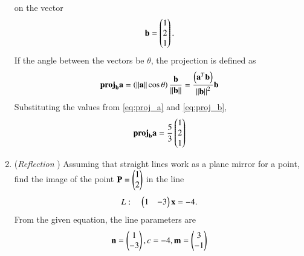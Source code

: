 \begin{enumerate}[label=\thesection.\arabic*.,ref=\thesection.\theenumi]
\begin{align}
\end{align}
on the vector
\begin{align}
\label{eq:proj_b}
\mathbf{b}=\begin{pmatrix}1\\2\\1\end{pmatrix}.
\end{align}
\solution 
%
If the angle between the vectors be $\theta$, the projection is defined as 
\begin{align}
\textbf{proj}_{\mathbf{b}}\mathbf{a} = 
\left(\left\lVert\mathbf{a}\right\rVert\cos\theta\right) \frac{\mathbf{b}}{\left\lVert\mathbf{b}\right\rVert}
=  \frac{\left(\mathbf{a}^T\mathbf{b}\right)}{\left\lVert\mathbf{b}\right\rVert^2}\mathbf{b}
\end{align}
Substituting the values from \eqref{eq:proj_a}
 and \eqref{eq:proj_b},
\begin{align}
\textbf{proj}_{\mathbf{b}}\mathbf{a} = \frac{5}{3}\begin{pmatrix}1\\2\\1\end{pmatrix}
\end{align}
\item ({\em Reflection }) Assuming that straight lines work as a plane mirror for a point, find the image of the point $\mathbf{P}=\begin{pmatrix}1\\2\end{pmatrix}$ in the line 
%
\begin{align}
L: \quad \begin{pmatrix}1 & -3\end{pmatrix}\mathbf{x}  = -4.
\end{align}
\solution From the given equation, the line parameters are
\begin{align}
\mathbf{n} = \begin{pmatrix}1 \\ -3\end{pmatrix}, c =  -4, \mathbf{m} = \begin{pmatrix}3 \\ -1\end{pmatrix}
\end{align}


\end{enumerate}
